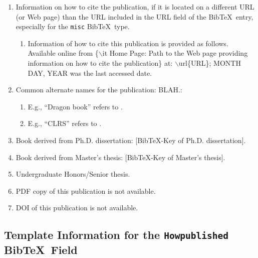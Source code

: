 \documentclass[letter,12pt]{article}
\begin{document}
\begin{enumerate}
\begin{enumerate}
	\end{enumerate}
\item Information on how to cite the publication, if it is located on a different URL (or Web page) than the URL included in the URL field of the {\sc Bib}\TeX\ entry, especially for the {\tt misc} {\sc Bib}\TeX\ type. \vspace{-0.3cm}
	\begin{enumerate} \itemsep -2pt
	\item Information of how to cite this publication is provided as follows. Available online from \{$\backslash$it Home Page: Path to the Web page providing information on how to cite the publication\} at: $\backslash$url\{URL\}; MONTH DAY, YEAR was the last accessed date.
	\end{enumerate}
\item Common alternate names for the publication: BLAH.: \vspace{-0.3cm}
	\begin{enumerate} \itemsep -2pt
	\item E.g., ``Dragon book'' \cite{WikipediaContributors2021f} refers to \cite{Aho2007,Aho1986}.
	\item E.g., ``CLRS'' \cite{WikipediaContributors2022d} refers to \cite{Cormen2022,Cormen2009,Cormen2001}.
	\end{enumerate}
\item Book derived from Ph.D. dissertation: [BibTeX-Key of Ph.D. dissertation].
\item Book derived from Master's thesis: [BibTeX-Key of Master's thesis].
\item Undergraduate Honors/Senior thesis.
\item PDF copy of this publication is not available.
\item DOI of this publication is not available.
\end{enumerate}











\subsection{Template Information for the {\tt Howpublished} {\sc Bib}\TeX\ Field}
\label{ssec:TemplateInformationForTheHowpublishedBibTeXField}
\end{document}
